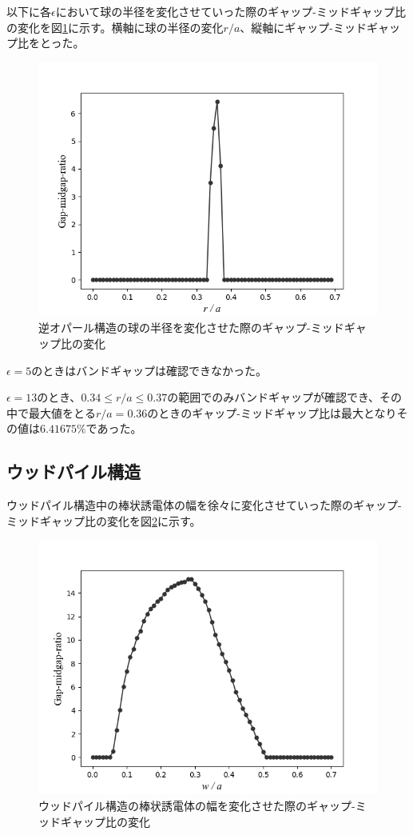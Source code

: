 \documentclass[platex,dvipdfmx]{jsreport}
\numberwithin{equation}{section}
\begin{document}
以下に各$\epsilon$において球の半径を変化させていった際のギャップ-ミッドギャップ比の変化を図\ref{fig:inv_opal}に示す。横軸に球の半径の変化$r / a$、縦軸にギャップ-ミッドギャップ比をとった。

\begin{figure}[htbp]
  \centering
  \includegraphics[width=0.6\linewidth]{results/inv_opals.png}
  \caption{逆オパール構造の球の半径を変化させた際のギャップ-ミッドギャップ比の変化}
  \label{fig:inv_opal}
\end{figure}




$\epsilon = 5$のときはバンドギャップは確認できなかった。

$\epsilon = 13$のとき、$0.34 \leq r / a \leq 0.37$の範囲でのみバンドギャップが確認でき、その中で最大値をとる$r / a = 0.36$のときのギャップ-ミッドギャップ比は最大となりその値は$6.41675 \% $であった。



\subsection{ウッドパイル構造}
ウッドパイル構造中の棒状誘電体の幅を徐々に変化させていった際のギャップ-ミッドギャップ比の変化を図\ref{fig:woodpile}に示す。

\begin{figure}[htbp]
  \centering
  \includegraphics[width=0.6\linewidth]{results/woodpile.png}
  \caption{ウッドパイル構造の棒状誘電体の幅を変化させた際のギャップ-ミッドギャップ比の変化}
  \label{fig:woodpile}
\end{figure}
\end{document}
